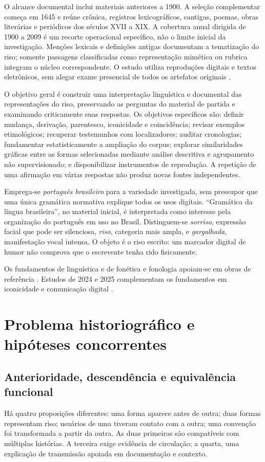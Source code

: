 O alcance documental inclui materiais anteriores a 1900. A seleção complementar começa em 1645 e reúne crônica, registros lexicográficos, cantigas, poemas, obras literárias e periódicos dos séculos XVII a XIX. A cobertura anual dirigida de 1900 a 2009 é um recorte operacional específico, não o limite inicial da investigação. Menções lexicais e definições antigas documentam a tematização do riso; somente passagens classificadas como representação mimética ou rubrica integram o núcleo correspondente. O estudo utiliza reproduções digitais e textos eletrônicos, sem alegar exame presencial de todos os artefatos originais \cite{r4chronicacompanhiaiesvportugal,r4vocabularioportuguezlatino,r4violadelereno}.

O objetivo geral é construir uma interpretação linguística e documental das representações do riso, preservando as perguntas do material de partida e examinando criticamente suas respostas. Os objetivos específicos são: definir mudança, derivação, parentesco, iconicidade e coincidência; revisar exemplos etimológicos; recuperar testemunhos com localizadores; auditar cronologias; fundamentar estatisticamente a ampliação do corpus; explorar similaridades gráficas entre as formas selecionadas mediante análise descritiva e agrupamento não supervisionado; e disponibilizar instrumentos de reprodução. A repetição de uma afirmação em várias respostas não produz novas fontes independentes.

Emprega-se \emph{português brasileiro} para a variedade investigada, sem pressupor que uma única gramática normativa explique todos os usos digitais. ``Gramática da língua brasileira'', no material inicial, é interpretada como interesse pela organização do português em uso no Brasil. Distinguem-se \emph{sorriso}, expressão facial que pode ser silenciosa, \emph{riso}, categoria mais ampla, e \emph{gargalhada}, manifestação vocal intensa. O objeto é o riso escrito: um marcador digital de humor não comprova que o escrevente tenha rido fisicamente.

Os fundamentos de linguística e de fonética e fonologia apoiam-se em obras de referência \cite{martelotta2008,seara2015}. Estudos de 2024 e 2025 complementam os fundamentos em iconicidade e comunicação digital \cite{iida2024,badrakh2024,kempe2025}.

\section{Problema historiográfico e hipóteses concorrentes}
\subsection{Anterioridade, descendência e equivalência funcional}
Há quatro proposições diferentes: uma forma aparece antes de outra; duas formas representam riso; usuários de uma tiveram contato com a outra; uma convenção foi transformada a partir da outra. As duas primeiras são compatíveis com múltiplas histórias. A terceira exige evidência de circulação; a quarta, uma explicação de transmissão apoiada em documentação e contexto.

